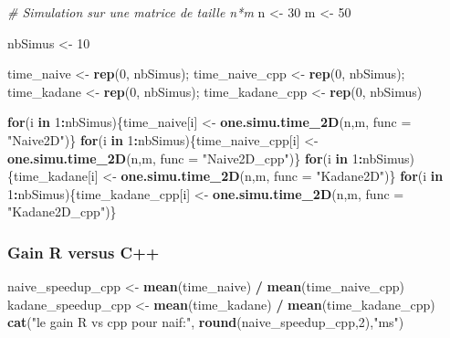 \documentclass[
]{article}
\newenvironment{Shaded}{\begin{snugshade}}{\end{snugshade}}
\newcommand{\AttributeTok}[1]{\textcolor[rgb]{0.13,0.29,0.53}{#1}}
\newcommand{\CommentTok}[1]{\textcolor[rgb]{0.56,0.35,0.01}{\textit{#1}}}
\newcommand{\ControlFlowTok}[1]{\textcolor[rgb]{0.13,0.29,0.53}{\textbf{#1}}}
\newcommand{\DecValTok}[1]{\textcolor[rgb]{0.00,0.00,0.81}{#1}}
\newcommand{\FunctionTok}[1]{\textcolor[rgb]{0.13,0.29,0.53}{\textbf{#1}}}
\newcommand{\NormalTok}[1]{#1}
\newcommand{\OtherTok}[1]{\textcolor[rgb]{0.56,0.35,0.01}{#1}}
\newcommand{\SpecialCharTok}[1]{\textcolor[rgb]{0.81,0.36,0.00}{\textbf{#1}}}
\newcommand{\StringTok}[1]{\textcolor[rgb]{0.31,0.60,0.02}{#1}}
\begin{document}
\begin{Shaded}
\begin{Highlighting}[]
\CommentTok{\# Simulation sur une matrice de taille n*m}
\NormalTok{n }\OtherTok{\textless{}{-}} \DecValTok{30}
\NormalTok{m }\OtherTok{\textless{}{-}} \DecValTok{50}

\NormalTok{nbSimus }\OtherTok{\textless{}{-}} \DecValTok{10}

\NormalTok{time\_naive }\OtherTok{\textless{}{-}} \FunctionTok{rep}\NormalTok{(}\DecValTok{0}\NormalTok{, nbSimus); time\_naive\_cpp }\OtherTok{\textless{}{-}} \FunctionTok{rep}\NormalTok{(}\DecValTok{0}\NormalTok{, nbSimus);}
\NormalTok{time\_kadane }\OtherTok{\textless{}{-}} \FunctionTok{rep}\NormalTok{(}\DecValTok{0}\NormalTok{, nbSimus); time\_kadane\_cpp }\OtherTok{\textless{}{-}} \FunctionTok{rep}\NormalTok{(}\DecValTok{0}\NormalTok{, nbSimus)}

\ControlFlowTok{for}\NormalTok{(i }\ControlFlowTok{in} \DecValTok{1}\SpecialCharTok{:}\NormalTok{nbSimus)\{time\_naive[i] }\OtherTok{\textless{}{-}} \FunctionTok{one.simu.time\_2D}\NormalTok{(n,m, }\AttributeTok{func =} \StringTok{"Naive2D"}\NormalTok{)\}}
\ControlFlowTok{for}\NormalTok{(i }\ControlFlowTok{in} \DecValTok{1}\SpecialCharTok{:}\NormalTok{nbSimus)\{time\_naive\_cpp[i] }\OtherTok{\textless{}{-}} \FunctionTok{one.simu.time\_2D}\NormalTok{(n,m, }\AttributeTok{func =} \StringTok{"Naive2D\_cpp"}\NormalTok{)\}}
\ControlFlowTok{for}\NormalTok{(i }\ControlFlowTok{in} \DecValTok{1}\SpecialCharTok{:}\NormalTok{nbSimus)\{time\_kadane[i] }\OtherTok{\textless{}{-}} \FunctionTok{one.simu.time\_2D}\NormalTok{(n,m, }\AttributeTok{func =} \StringTok{"Kadane2D"}\NormalTok{)\}}
\ControlFlowTok{for}\NormalTok{(i }\ControlFlowTok{in} \DecValTok{1}\SpecialCharTok{:}\NormalTok{nbSimus)\{time\_kadane\_cpp[i] }\OtherTok{\textless{}{-}} \FunctionTok{one.simu.time\_2D}\NormalTok{(n,m, }\AttributeTok{func =} \StringTok{"Kadane2D\_cpp"}\NormalTok{)\}}
\end{Highlighting}
\end{Shaded}

\subsubsection{Gain R versus C++}\label{gain-r-versus-c}

\begin{Shaded}
\begin{Highlighting}[]
\NormalTok{naive\_speedup\_cpp }\OtherTok{\textless{}{-}} \FunctionTok{mean}\NormalTok{(time\_naive) }\SpecialCharTok{/} \FunctionTok{mean}\NormalTok{(time\_naive\_cpp)}
\NormalTok{kadane\_speedup\_cpp }\OtherTok{\textless{}{-}} \FunctionTok{mean}\NormalTok{(time\_kadane) }\SpecialCharTok{/} \FunctionTok{mean}\NormalTok{(time\_kadane\_cpp)}
\FunctionTok{cat}\NormalTok{(}\StringTok{"le gain R vs cpp pour naif:"}\NormalTok{, }\FunctionTok{round}\NormalTok{(naive\_speedup\_cpp,}\DecValTok{2}\NormalTok{),}\StringTok{"ms"}\NormalTok{)}
\end{Highlighting}
\end{Shaded}
\end{document}
